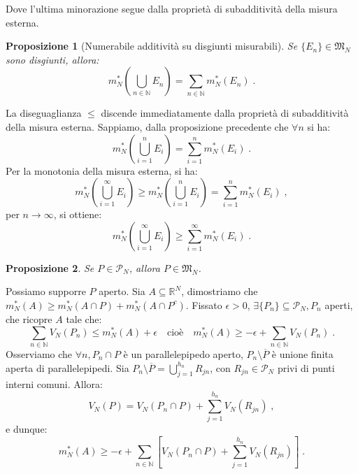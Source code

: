 \documentclass[a4paper,12pt]{report}
\theoremstyle{plain}
\newtheorem{prop}{Proposizione}[section]
\theoremstyle{definition}
\theoremstyle{remark}
\numberwithin{equation}{section}
\begin{document}
Dove l'ultima minorazione segue dalla proprietà di subadditività della misura esterna.
\endproof
\begin{prop}[Numerabile additività su disgiunti misurabili] Se $\{E_n\} \in \mathfrak{M}_N$ sono disgiunti, allora:
\begin{equation}
m_N^*\left(\bigcup_{n \in \mathbb{N}} E_n\right) = \sum_{n \in \mathbb{N}} m_N^*(E_n)\;.
\end{equation}
\end{prop}
\proof La diseguaglianza $\le$ discende immediatamente dalla proprietà di subadditività della misura esterna. Sappiamo, dalla proposizione precedente che $\forall n$ si ha:
\begin{equation}
m_N^*\left(\bigcup_{i=1}^n E_i\right)=\sum_{i=1}^n m_N^*(E_i)\;.
\end{equation}
Per la monotonia della misura esterna, si ha:
\begin{equation}
m_N^*\left(\bigcup_{i=1}^{\infty} E_i \right) \ge m_N^*\left(\bigcup_{i=1}^n E_i\right)=\sum_{i=1}^n m_N^*(E_i)\;,
\end{equation}
per $n \to \infty$, si ottiene:
\begin{equation}
m_N^*\left(\bigcup_{i=1}^{\infty} E_i \right) \ge \sum_{i=1}^{\infty} m_N^*(E_i)\;.
\end{equation}
\endproof
\begin{prop} Se $P \in \mathcal{P}_N$, allora $P \in \mathfrak{M}_N$.
\end{prop}
\proof Possiamo supporre $P$ aperto. Sia $A \subseteq \mathbb{R}^N$, dimostriamo che $m_N^*(A)\ge m_N^*(A\cap P)+m_N^*(A\cap P^c)$. Fissato $\epsilon>0$, $\exists\{P_n\} \subseteq \mathcal{P}_N, P_n$ aperti, che ricopre $A$ tale che:
\begin{equation}
\sum_{n \in \mathbb{N}} V_N(P_n) \le m_N^*(A)+\epsilon\quad\mbox{cioè}\quad m_N^*(A)\ge -\epsilon+\sum_{n \in \mathbb{N}} V_N(P_n)\;.
\end{equation}
Osserviamo che $\forall n, P_n \cap P$ è un parallelepipedo aperto, $P_n \setminus \overline{P}$ è unione finita aperta di parallelepipedi.
Sia $P_n\setminus \overline{P}=\bigcup_{j=1}^{h_n} R_{jn}$, con $R_{jn} \in \mathcal{P}_N$ privi di punti interni comuni. Allora:
\begin{equation}
V_N(P)=V_N(P_n\cap P)+\sum_{j=1}^{h_n} V_N(R_{jn})\;,
\end{equation}
e dunque:
\begin{equation}
m_N^*(A) \ge -\epsilon+\sum_{n \in \mathbb{N}}\left[V_N(P_n\cap P)+\sum_{j=1}^{h_n}V_N(R_{jn})\right]\;.
\end{equation}
\end{document}

